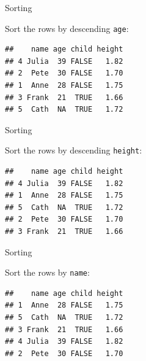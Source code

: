 \documentclass[ignorenonframetext,]{beamer}
\newenvironment{Shaded}{\begin{snugshade}}{\end{snugshade}}
\newcommand{\DataTypeTok}[1]{\textcolor[rgb]{0.13,0.29,0.53}{#1}}
\newcommand{\KeywordTok}[1]{\textcolor[rgb]{0.13,0.29,0.53}{\textbf{#1}}}
\newcommand{\NormalTok}[1]{#1}
\newcommand{\OperatorTok}[1]{\textcolor[rgb]{0.81,0.36,0.00}{\textbf{#1}}}
\newcommand{\OtherTok}[1]{\textcolor[rgb]{0.56,0.35,0.01}{#1}}
\begin{document}
\begin{frame}[fragile]{Sorting}
\protect\hypertarget{sorting-2}{}

Sort the rows by descending \texttt{age}:

\begin{Shaded}
\end{Shaded}

\begin{verbatim}
##    name age child height
## 4 Julia  39 FALSE   1.82
## 2  Pete  30 FALSE   1.70
## 1  Anne  28 FALSE   1.75
## 3 Frank  21  TRUE   1.66
## 5  Cath  NA  TRUE   1.72
\end{verbatim}

\end{frame}

\begin{frame}[fragile]{Sorting}
\protect\hypertarget{sorting-3}{}

Sort the rows by descending \texttt{height}:

\begin{Shaded}
\end{Shaded}

\begin{verbatim}
##    name age child height
## 4 Julia  39 FALSE   1.82
## 1  Anne  28 FALSE   1.75
## 5  Cath  NA  TRUE   1.72
## 2  Pete  30 FALSE   1.70
## 3 Frank  21  TRUE   1.66
\end{verbatim}

\end{frame}

\begin{frame}[fragile]{Sorting}
\protect\hypertarget{sorting-4}{}

Sort the rows by \texttt{name}:

\begin{Shaded}
\end{Shaded}

\begin{verbatim}
##    name age child height
## 1  Anne  28 FALSE   1.75
## 5  Cath  NA  TRUE   1.72
## 3 Frank  21  TRUE   1.66
## 4 Julia  39 FALSE   1.82
## 2  Pete  30 FALSE   1.70
\end{verbatim}

\end{frame}
\end{document}
